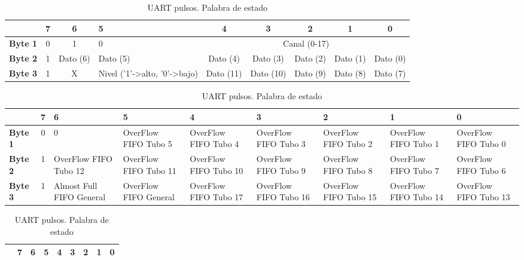 		\begin{table}[h]
			\tiny
			\begin{tabularx}{\textwidth}{|l|c|c|X|c|c|c|c|c|}
				\hline
				\rowcolor[HTML]{C0C0C0} 
				\multicolumn{1}{|r|}{\textbf{Bit}}    	& 7 & 6          & 5 				& 4 	       & 3 	     & 2 	  & 1          & 0 	     \\ \hline
				\cellcolor[HTML]{C0C0C0}\textbf{Byte 1} & 0 & 1          & 0  				& \multicolumn{5}{c|}{Canal (0-17)}				     \\ \hline
				\cellcolor[HTML]{C0C0C0}\textbf{Byte 2} & 1 & Dato (6)	 & Dato (5)      		& Dato (4)     & Dato (3)    & Dato (2)   & Dato (1)   & Dato (0)    \\ \hline
				\cellcolor[HTML]{C0C0C0}\textbf{Byte 3} & 1 & X          & Nivel ('1'->alto, '0'->bajo) & Dato (11)    & Dato (10)   & Dato (9)   & Dato (8)   & Dato (7)    \\ \hline
			\end{tabularx}
			\caption{UART pulsos. Palabra de ancho de pulso}
			\label{tab:FPGAUartPulso}
			\begin{tabularx}{\textwidth}{|l|c|X|X|X|X|X|X|X|}
				\hline
				\rowcolor[HTML]{C0C0C0} 
				\multicolumn{1}{|r|}{\textbf{Bit}} 	& 7 & 6 		       & 5 		       & 4		       & 3 		       & 2		       & 1          	       & 0			\\ \hline
				\cellcolor[HTML]{C0C0C0}\textbf{Byte 1} & 0 & 0                        & OverFlow FIFO Tubo 5  & OverFlow FIFO Tubo 4  & OverFlow FIFO Tubo 3  & OverFlow FIFO Tubo 2  & OverFlow FIFO Tubo 1  & OverFlow FIFO Tubo 0	\\ \hline
				\cellcolor[HTML]{C0C0C0}\textbf{Byte 2} & 1 & OverFlow FIFO Tubo 12    & OverFlow FIFO Tubo 11 & OverFlow FIFO Tubo 10 & OverFlow FIFO Tubo 9  & OverFlow FIFO Tubo 8  & OverFlow FIFO Tubo 7  & OverFlow FIFO Tubo 6	\\ \hline
				\cellcolor[HTML]{C0C0C0}\textbf{Byte 3} & 1 & Almost Full FIFO General & OverFlow FIFO General & OverFlow FIFO Tubo 17 & OverFlow FIFO Tubo 16 & OverFlow FIFO Tubo 15 & OverFlow FIFO Tubo 14 & OverFlow FIFO Tubo 13	\\ \hline
			\end{tabularx}
			\caption{UART pulsos. Palabra de estado}
			\label{tab:FPGAUartOver}
			\begin{tabularx}{\textwidth}{|l|X|c|c|c|c|c|c|c|}
				\hline
				\rowcolor[HTML]{C0C0C0} 
				\multicolumn{1}{|r|}{\textbf{Bit}}    	 & 7 & 6           & 5 		& 4 	      & 3 	    & 2 	 & 1           & 0 	     	\\ \hline

\end{tabularx}
\end{table}

